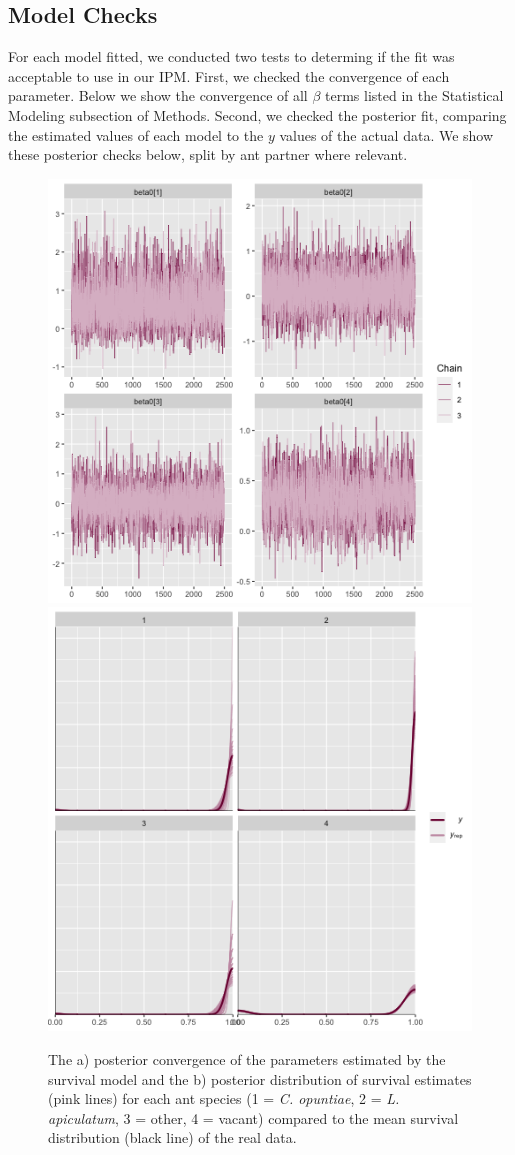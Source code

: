 \documentclass[11pt]{article}
\begin{document}
\subsection*{Model Checks}
For each model fitted, we conducted two tests to determing if the fit was acceptable to use in our IPM. 
First, we checked the convergence of each parameter.
Below we show the convergence of all $\beta$ terms listed in the Statistical Modeling subsection of Methods.
Second, we checked the posterior fit, comparing the estimated values of each model to the $y$ values of the actual data.
We show these posterior checks below, split by ant partner where relevant.
\begin{figure}
	\includegraphics[width = 0.45\linewidth]{Figures/surv_conv.png}
	\includegraphics[width=0.45\linewidth]{Figures/surv_post.png}
	\caption{The a) posterior convergence of the parameters estimated by the survival model and the b) posterior distribution of survival estimates (pink lines) for each ant species (1 = \textit{C. opuntiae}, 2 = \textit{L. apiculatum}, 3 = other, 4 = vacant) compared to the mean survival distribution (black line) of the real data.}
	\label{fig:Surv_post}
\end{figure}
\end{document}
